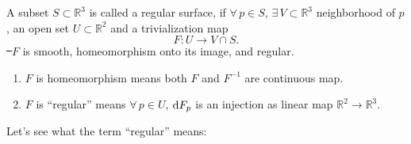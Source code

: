 \begin{definition}\hfill\par
    A subset \(S\subset \mathbb{R}^3\) is called a regular surface, if \(\forall\,p
    \in S\), \(\exists\, V\subset\mathbb{R}^3\) neighborhood of \(p\), an open set
    \(U\subset \mathbb{R}^2\) and a trivialization map \[
        F\colon U\to V\cap S
    .\] \st\ \(F\) is smooth, homeomorphism onto its image, and regular.
\end{definition}
\begin{remark}\hfill
\begin{enumerate}[(1)]
    \item \(F\) is homeomorphism means both \(F\) and \(F^{-1}\) are continuous map.
    \item \(F\) is ``regular'' means \(\forall\,p\in U\), \(\dif F_p\) is an 
        injection as linear map \(\mathbb{R}^2\to \mathbb{R}^3\).
\end{enumerate}
\end{remark}

Let's see what the term ``regular'' means:

